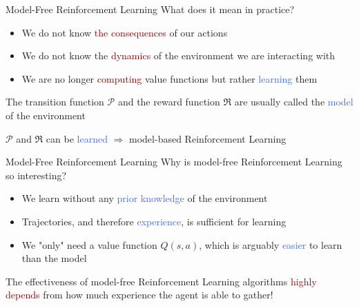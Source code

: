 \documentclass{beamer}
\begin{document}
\begin{frame}{Model-Free Reinforcement Learning}
	What does it mean in practice?
	\begin{itemize}
		\item We do not know \textcolor{Maroon}{the consequences} of our actions
		\item We do not know the \textcolor{Maroon}{dynamics} of the environment we are interacting with
		\item We are no longer \textcolor{Maroon}{computing} value functions but rather \textcolor{RoyalBlue}{learning} them
	\end{itemize}

	\bigskip

	The transition function $\mathcal{P}$ and the reward function $\Re$ are usually called the \textcolor{RoyalBlue}{model} of the environment
	
	\bigskip
	
	$\mathcal{P}$ and $\Re$ can be \textcolor{RoyalBlue}{learned} $\Rightarrow$ model-based Reinforcement Learning

\end{frame}


\begin{frame}{Model-Free Reinforcement Learning}
	Why is model-free Reinforcement Learning so interesting?
	\begin{itemize}
		\item We learn without any \textcolor{RoyalBlue}{prior knowledge} of the environment
		\item Trajectories, and therefore \textcolor{RoyalBlue}{experience}, is sufficient for learning
		\item We "only" need a value function $Q(s,a)$, which is arguably \textcolor{RoyalBlue}{easier} to learn than the model
	\end{itemize}

	\bigskip

	The effectiveness of model-free Reinforcement Learning algorithms \textcolor{Maroon}{highly depends} from how much experience the agent is able to gather!

\end{frame}
\end{document}
